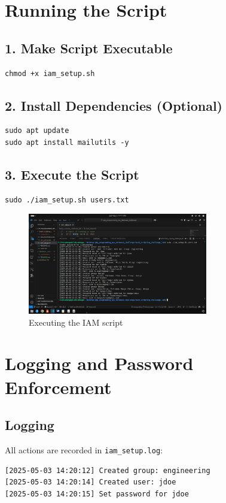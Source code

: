\documentclass[a4paper,11pt]{article}
\begin{document}
\section*{Running the Script}

\subsection*{1. Make Script Executable}
\begin{lstlisting}
chmod +x iam_setup.sh
\end{lstlisting}

\subsection*{2. Install Dependencies (Optional)}
\begin{lstlisting}
sudo apt update
sudo apt install mailutils -y
\end{lstlisting}

\subsection*{3. Execute the Script}
\begin{lstlisting}
sudo ./iam_setup.sh users.txt
\end{lstlisting}

\begin{figure}[h!]
  \centering
  \includegraphics[width=0.7\textwidth]{screenshots/run_script.png}
  \caption{Executing the IAM script}
\end{figure}

\section*{Logging and Password Enforcement}

\subsection*{Logging}
All actions are recorded in \texttt{iam_setup.log}:
\begin{lstlisting}
[2025-05-03 14:20:12] Created group: engineering
[2025-05-03 14:20:14] Created user: jdoe
[2025-05-03 14:20:15] Set password for jdoe
\end{lstlisting}
\end{document}
